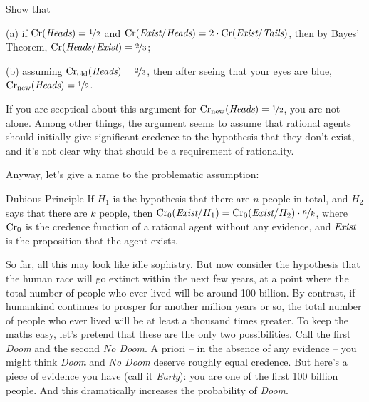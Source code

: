 \begin{exercise2}
  Show that
  \begin{enumerate*}
  \item[(a)] if $\text{Cr}(\emph{Heads}) = \nicefrac{1}{2}$ and
    $\text{Cr}(\emph{Exist}/\emph{Heads}) = 2 \cdot
    \text{Cr}(\emph{Exist}/\emph{Tails})$, then by Bayes' Theorem,
    $\text{Cr}(\emph{Heads}/\emph{Exist}) = \nicefrac{2}{3}$;
  \item[(b)] assuming
    $\text{Cr}_\text{old}(\emph{Heads}) = \nicefrac{2}{3}$, then after
    seeing that your eyes are blue,
    $\text{Cr}_\text{new}(\emph{Heads}) = \nicefrac{1}{2}$.
  \end{enumerate*}
  \vspace{-5mm}
\end{exercise2}

If you are sceptical about this argument for $\text{Cr$_{\text{new}}$}(\emph{Heads}) =
\nicefrac{1}{2}$, you are not alone. Among other things, the argument seems to
assume that rational agents should initially give significant credence
to the hypothesis that they don't exist, and it's not clear why that
should be a requirement of rationality.

Anyway, let's give a name to the problematic assumption:
\begin{genericthm}{Dubious Principle}
  If $H_1$ is the hypothesis that there are $n$ people in total, and
  $H_2$ says that there are $k$ people, then $\text{Cr}_0(\emph{Exist} /
  H_1) = \text{Cr}_0(\emph{Exist}/H_2) \cdot \nicefrac{n}{k}$, where $\text{Cr}_0$
  is the credence function of a rational agent without any evidence,
  and $\emph{Exist}$ is the proposition that the agent exists.
\end{genericthm}

So far, all this may look like idle sophistry. But now consider the
hypothesis that the human race will go extinct within the next few
years, at a point where the total number of people who ever lived will
be around 100 billion. By contrast, if humankind continues to prosper
for another million years or so, the total number of people who ever
lived will be at least a thousand times greater. To keep the maths
easy, let's pretend that these are the only two possibilities. Call
the first \emph{Doom} and the second \emph{No Doom}. A priori -- in
the absence of any evidence -- you might think \emph{Doom} and
\emph{No Doom} deserve roughly equal credence. But here's a piece of
evidence you have (call it \emph{Early}): you are one of the first 100
billion people. And this dramatically increases the probability of
\emph{Doom}.

